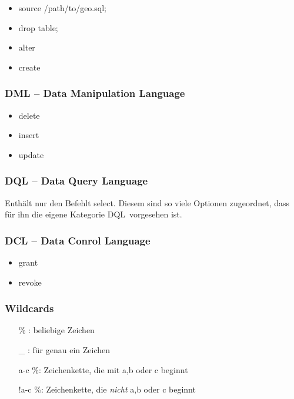 	\begin{itemize}
		\item source /path/to/geo.sql;
		\item drop table;
		\item alter
		\item create
	\end{itemize}

\subsubsection{DML -- Data Manipulation Language}
	
	\begin{itemize}
		\item delete 
		\item insert 
		\item update
	\end{itemize}

\subsubsection{DQL -- Data Query Language}
Enthält nur den Befehlt \ql select\qr. Diesem sind so viele Optionen zugeordnet, dass für ihn die eigene Kategorie \ql DQL\qr\ vorgesehen ist.

\subsubsection{DCL -- Data Conrol Language}
	
	\begin{itemize}
		\item grant
		\item revoke
	\end{itemize}
	
\subsubsection{Wildcards}

\begin{itemize}
	\item [\%]: beliebige Zeichen
	\item [\_]: für genau ein Zeichen
	\item [a-c]\%: Zeichenkette, die mit a,b oder c beginnt  
	\item [!a-c]\%: Zeichenkette, die \emph{nicht} a,b oder c beginnt
\end{itemize}

